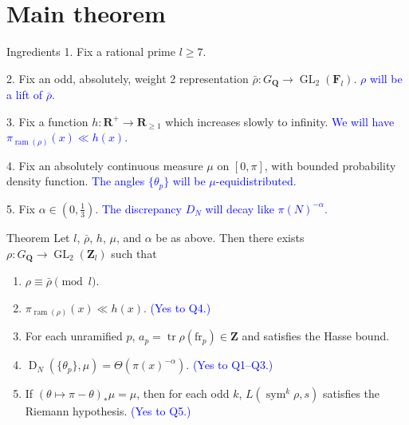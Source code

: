 \documentclass[handout]{beamer}
\DeclareMathOperator{\D}{D}
\DeclareMathOperator{\GL}{GL}
\DeclareMathOperator{\ram}{ram}
\DeclareMathOperator{\sym}{sym}
\DeclareMathOperator{\tr}{tr}
\newcommand{\bF}{\mathbf{F}}
\newcommand{\bQ}{\mathbf{Q}}
\newcommand{\bR}{\mathbf{R}}
\newcommand{\bZ}{\mathbf{Z}}
\newcommand{\frob}{\mathrm{fr}}
\begin{document}
\section{Main theorem}


\begin{frame}{Ingredients}
1. Fix a rational prime $l\geqslant 7$. 
\pause

2. Fix an odd, absolutely, weight 2 representation 
$\bar\rho\colon G_\bQ \to \GL_2(\bF_l)$.
\pause
\textcolor{blue}{$\rho$ will be a lift of $\bar\rho$.}
\pause

3. Fix a function $h\colon \bR^+ \to \bR_{\geqslant 1}$ which increases slowly 
to infinity. 
\pause
\textcolor{blue}{We will have $\pi_{\ram(\rho)}(x) \ll h(x)$.}
\pause

4. Fix an absolutely continuous measure $\mu$ on $[0,\pi]$, with bounded 
probability density function.
\pause
\textcolor{blue}{The angles $\{\theta_p\}$ will be $\mu$-equidistributed.}
\pause

5. Fix $\alpha\in \left(0,\frac 1 3\right)$. 
\pause
\textcolor{blue}{The discrepancy $D_N$ will decay like $\pi(N)^{-\alpha}$.}
\end{frame}


\begin{frame}{Theorem}
Let $l$, $\bar\rho$, $h$, $\mu$, and $\alpha$ be as above. Then there exists 
$\rho\colon G_\bQ \to \GL_2(\bZ_l)$ such that 
\begin{enumerate}
\item
$\rho \equiv \bar\rho\pmod{l}$. 
\pause

\item
$\pi_{\ram(\rho)}(x) \ll h(x)$. 
\pause
\textcolor{blue}{(Yes to Q4.)}
\pause

\item
For each unramified $p$, $a_p = \tr \rho(\frob_p)\in \bZ$ and satisfies the 
Hasse bound.
\pause

\item
$\D_N(\{\theta_p\},\mu) = \Theta(\pi(x)^{-\alpha})$. 
\pause
\textcolor{blue}{(Yes to Q1--Q3.)}
\pause

\item
If $(\theta\mapsto \pi-\theta)_\ast \mu = \mu$, then for each odd $k$, 
$L(\sym^k \rho,s)$ satisfies the Riemann hypothesis. 
\pause
\textcolor{blue}{(Yes to Q5.)}
\end{enumerate}
\end{frame}
\end{document}
